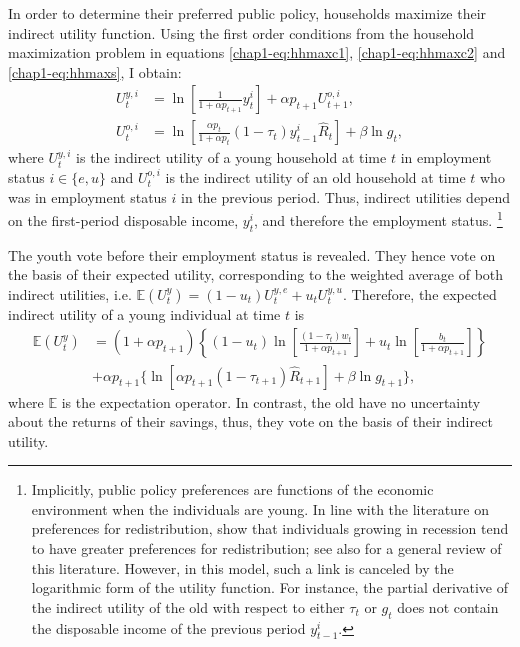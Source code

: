 In order to determine their preferred public policy, households maximize their indirect utility function. Using the first order conditions from the household maximization problem in equations \eqref{chap1-eq:hhmaxc1}, \eqref{chap1-eq:hhmaxc2} and \eqref{chap1-eq:hhmaxs}, I obtain:
\begin{align}
	U_t^{y,i} &= \ln\left[\frac{1}{1+\alpha p_{t+1}}y_t^i\right]+ \alpha p_{t+1} U_{t+1}^{o,i}, \label{chap1-eq:utility_young} \\ 
	U_t^{o,i} &= \ln\left[\frac{\alpha p_t}{1+\alpha p_t}(1-\tau_t)y_{t-1}^i\hat{R}_t\right] + \beta \ln g_t, \label{chap1-eq:utility_old}
\end{align}
where $U_t^{y,i}$ is the indirect utility of a young household at time $t$ in employment status $i\in\{e, u\}$ and $U_t^{o,i}$ is the indirect utility of an old household at time $t$ who was in employment status $i$ in the previous period. 
Thus, indirect utilities depend on the first-period disposable income, $y^i_t$, and therefore the employment status.%
\footnote{Implicitly, public policy preferences are functions of the economic environment when the individuals are young. In line with the literature on preferences for redistribution, \citet{Giuliano2013Growing} show that individuals growing in recession tend to have greater preferences for redistribution; see also \citet{Alesina2011Preferences} for a general review of this literature. However, in this model, such a link is canceled by the logarithmic form of the utility function. For instance, the partial derivative of the indirect utility of the old with respect to either $\tau_t$ or $g_t$ does not contain the disposable income of the previous period $y_{t-1}^i$.}

The youth vote before their employment status is revealed.
They hence vote on the basis of their expected utility, corresponding to the weighted average of both indirect utilities, i.e. $\mathbb{E}({U}_t^y) = (1-u_t)U_t^{y,e} + u_t U_t^{y,u}$.
Therefore, the expected indirect utility of a young individual at time $t$ is
\begin{equation}
\begin{aligned}\label{chap1-eq:expected_utility_young}
	\mathbb{E}({U}_t^y) &= (1+\alpha p_{t+1})\left\{(1-u_t)\ln\left[\frac{(1-\tau_t) w_t}{1+\alpha p_{t+1}}\right] + u_t \ln\left[\frac{b_t}{1+\alpha p_{t+1}}\right]\right\} \\
	&+ \alpha p_{t+1} \bigg\{ \ln\left[\alpha p_{t+1} (1-\tau_{t+1}) \hat{R}_{t+1}\right] + \beta \ln g_{t+1} \bigg\},
\end{aligned}
\end{equation}
where $\mathbb{E}$ is the expectation operator. In contrast, the old have no uncertainty about the returns of their savings, thus, they vote on the basis of their indirect utility.


